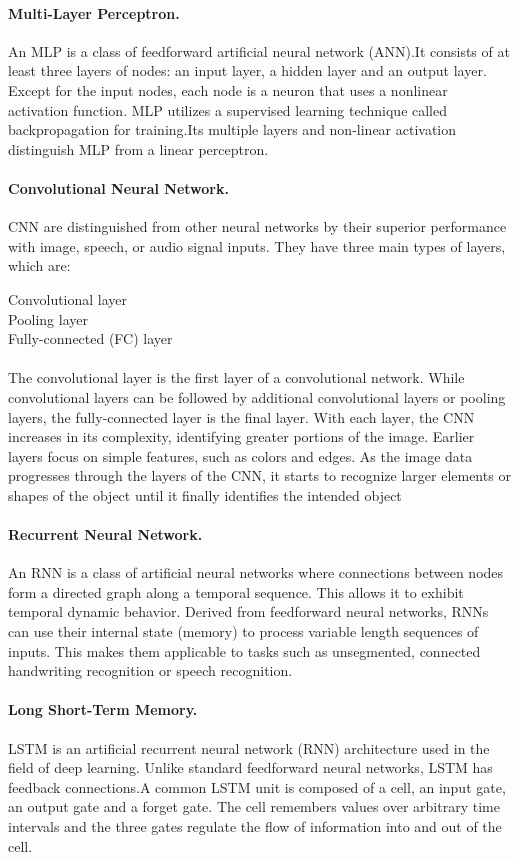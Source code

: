 \documentclass{article}
\begin{document}
\paragraph*{Multi-Layer Perceptron.}An MLP is a class of feedforward artificial neural network (ANN).It consists of at least three layers of nodes: an input layer, a hidden layer and an output layer. Except for the input nodes, each node is a neuron that uses a nonlinear activation function. MLP utilizes a supervised learning technique called backpropagation for training.Its multiple layers and non-linear activation distinguish MLP from a linear perceptron.

\paragraph*{Convolutional Neural Network.}
CNN are distinguished from other neural networks by their superior performance with image, speech, or audio signal inputs. They have three main types of layers, which are:

Convolutional layer \\
Pooling layer \\
Fully-connected (FC) layer \\ \\
The convolutional layer is the first layer of a convolutional network. While convolutional layers can be followed by additional convolutional layers or pooling layers, the fully-connected layer is the final layer. With each layer, the CNN increases in its complexity, identifying greater portions of the image. Earlier layers focus on simple features, such as colors and edges. As the image data progresses through the layers of the CNN, it starts to recognize larger elements or shapes of the object until it finally identifies the intended object

\paragraph*{Recurrent Neural Network.}
An RNN is a class of artificial neural networks where connections between nodes form a directed graph along a temporal sequence. This allows it to exhibit temporal dynamic behavior. Derived from feedforward neural networks, RNNs can use their internal state (memory) to process variable length sequences of inputs. This makes them applicable to tasks such as unsegmented, connected handwriting recognition or speech recognition.

\paragraph*{Long Short-Term Memory.}
LSTM is an artificial recurrent neural network (RNN) architecture used in the field of deep learning. Unlike standard feedforward neural networks, LSTM has feedback connections.A common LSTM unit is composed of a cell, an input gate, an output gate and a forget gate. The cell remembers values over arbitrary time intervals and the three gates regulate the flow of information into and out of the cell.
\end{document}
